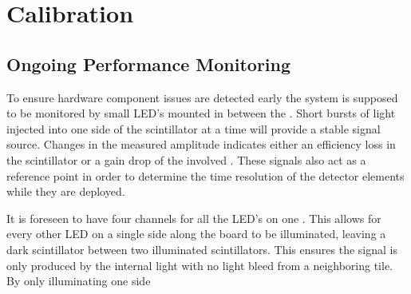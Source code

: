 \documentclass[../BTOF_summary.tex]{subfiles}
\begin{document}
\section{Calibration}

\subsection{Ongoing Performance Monitoring}

To ensure hardware component issues are detected early the system is supposed to be monitored by small LED's mounted in between the \sipms .
Short bursts of light injected into one side of the scintillator at a time will provide a stable signal source.
Changes in the measured amplitude indicates either an efficiency loss in the scintillator or a gain drop of the involved \sipms .
These signals also act as a reference point in order to determine the time resolution of the detector elements while they are deployed.

It is foreseen to have four channels for all the LED's on one \railboard .
This allows for every other LED on a single side along the board to be illuminated, leaving a dark scintillator between two illuminated scintillators.
This ensures the signal is only produced by the internal light with no light bleed from a neighboring tile.
By only illuminating one side 
\end{document}
